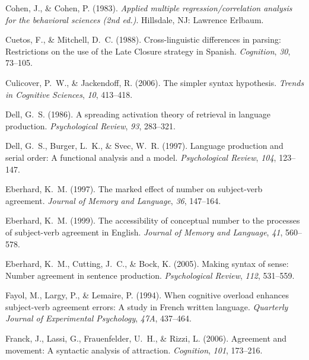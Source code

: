 \documentclass[12pt,titlepage]{article}
\newcommand{\itt}{\textit}  %
\begin{document}
\begin{description}
    \item Cohen, J., \& Cohen, P\@.  (1983).  \itt{Applied multiple
    regression/correlation analysis for the behavioral sciences (2nd
    ed.)}.  Hillsdale, NJ: Lawrence Erlbaum.
    
    \item Cuetos, F., \& Mitchell, D.~C\@.  (1988).  Cross-linguistic
    differences in parsing: Restrictions on the use of the Late Closure
    strategy in Spanish.  \itt{Cognition}, \itt{30}, 73--105.
    
    \item Culicover, P.~W., \& Jackendoff, R\@.  (2006).  The simpler
    syntax hypothesis.  \itt{Trends in Cognitive Sciences}, \itt{10},
    413--418.
    
    \item Dell, G.~S\@.  (1986).  A spreading activation theory of
    retrieval in language production.  \itt{Psychological Review},
    \itt{93}, 283--321.
    
    \item Dell, G.~S., Burger, L.~K., \& Svec, W.~R\@. (1997).  Language 
    production and serial order:  A functional analysis and a model.  
    \itt{Psychological Review}, \itt{104}, 123--147.
    
    \item Eberhard, K.~M\@.  (1997).  The marked effect of number on
    subject-verb agreement.  \itt{Journal of Memory and Language},
    \itt{36}, 147--164.

    \item Eberhard, K.~M\@.  (1999).  The accessibility of conceptual
    number to the processes of subject-verb agreement in English.
    \itt{Journal of Memory and Language}, \itt{41}, 560--578.

    \item Eberhard, K.~M., Cutting, J.~C., \& Bock, K\@.  (2005).  Making
    syntax of sense: Number agreement in sentence production.
    \itt{Psychological Review}, \itt{112}, 531--559.

    \item Fayol, M., Largy, P., \& Lemaire, P\@.  (1994).  When cognitive
    overload enhances subject-verb agreement errors: A study in French
    written language.  \itt{Quarterly Journal of Experimental Psychology},
    \itt{47A}, 437--464.
    
    \item Franck, J., Lassi, G., Frauenfelder, U.~H., \& Rizzi, L\@.
    (2006).  Agreement and movement: A syntactic analysis of attraction.
    \itt{Cognition}, \itt{101}, 173--216.
    

\end{description}
\end{document}
